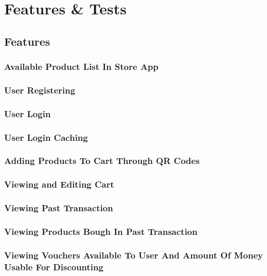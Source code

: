 \documentclass[12pt]{article}
\begin{document}
\pagebreak
\section{Features \& Tests}

\subsection{Features}

\subsubsection{Available Product List In Store App}

\subsubsection{User Registering}

\subsubsection{User Login}

\subsubsection{User Login Caching}

\subsubsection{Adding Products To Cart Through QR Codes}

\subsubsection{Viewing and Editing Cart}

\subsubsection{Viewing Past Transaction}

\subsubsection{Viewing Products Bough In Past Transaction}

\subsubsection{Viewing Vouchers Available To User And Amount Of Money Usable For Discounting}
\end{document}
